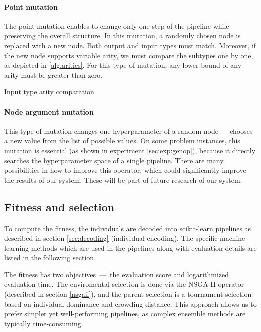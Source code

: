 \paragraph{Point mutation}
The point mutation enables to change only one step of the pipeline while preserving
the overall structure. In this mutation, a randomly chosen node is replaced with a
new node. Both output and input types must match. Moreover, if the new node
supports variable arity, we must compare the subtypes one by one, as depicted in
\ref{alg:arities}. For this type of mutation, any lower bound of any arity must
be greater than zero.


\begin{algorithm}[t]
\DontPrintSemicolon 
\caption{Input type arity comparation\label{alg:arities}}
  \;
  \;
  
\end{algorithm}

\paragraph{Node argument mutation}
This type of mutation changes one hyperparameter of a random node --- chooses a new
value from the list of possible values. On some problem instances, this mutation
is essential (as shown in experiment \ref{sec:exp:genop}), because it directly searches the hyperparameter space of a
single pipeline. There are many possibilities in how to improve this operator, which
could significantly improve the results of our system. These will be part of future
research of our system.

\subsection{Fitness and selection} \label{sec:fitsel}
To compute the fitness, the individuals are decoded into scikit-learn 
pipelines as described in section \ref{sec:decoding} (individual encoding).
The specific machine learning methods which are used in the pipelines along
with evaluation details are listed in the following section.

The fitness has two objectives~---~the evaluation score and logarithmized
evaluation time. The enviromental selection is done via the NSGA-II operator
(described in section \ref{nsgaii}), and the 
parent selection is a tournament selection based on individual dominance and 
crowding distance. This approach allows us to prefer simpler yet
well-performing pipelines, as complex ensemble methods are typically
time-consuming. 

